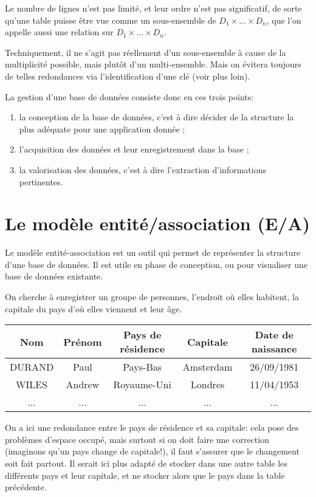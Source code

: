 \documentclass[a4paper]{scrartcl}
\begin{document}
		Le nombre de lignes n'est pas limité, et leur ordre n'est pas significatif, de sorte qu'une table puisse être vue 
		comme un sous-ensemble de $D_1\times...\times D_n$, que l'on appelle aussi une relation sur $D_1\times...\times D_n$.
		
		\rem Techniquement, il ne s'agit pas réellement d'un sous-ensemble à cause de la multiplicité possible, mais plutôt d'un multi-ensemble.
		Mais on évitera toujours de telles redondances via l'identification d'une clé (voir plus loin).

		La gestion d'une base de données consiste donc en ces trois points:
		\begin{enumerate}
			\item la conception de la base de données, c'est à dire décider de la structure la plus adéquate pour une application donnée ;
			\item l'acquisition des données et leur enregistrement dans la base ;
			\item la valorisation des données, c'est à dire l'extraction d'informations pertinentes.
		\end{enumerate}

	\section{Le modèle entité/association (E/A)}
		Le modèle entité-association est un outil qui permet de représenter la structure d'une base de données. 
		Il est utile en phase de conception, ou pour visualiser une base de données existante.

		\exemple On cherche à enregistrer un groupe de personnes, l'endroit où elles habitent, la capitale du pays d'où elles viennent et leur âge.

		\begin{center}
		\begin{tabular}{|c|c|c|c|c|}
			\hline
			Nom & Prénom & Pays de résidence & Capitale & Date de naissance \\
			\hline
			DURAND & Paul & Pays-Bas & Amsterdam & 26/09/1981 \\
			\hline
			WILES & Andrew & Royaume-Uni & Londres & 11/04/1953 \\
			\hline
			... & ... & ... & ... & ... \\
			\hline
		\end{tabular}
		\end{center}

		\rem On a ici une redondance entre le pays de résidence et sa capitale: cela pose des problèmes d'espace occupé,
		mais surtout si on doit faire une correction (imaginons qu'un pays change de capitale!), il faut s'assurer que
		le changement soit fait partout. Il serait ici plus adapté de stocker dans une autre table les différents pays
		et leur capitale, et ne stocker alors que le pays dans la table précédente.
\end{document}
